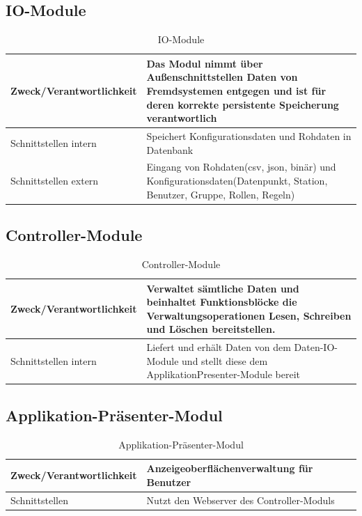 \subsection{IO-Module}
\begin{table}[th]
	\begin{tabularx}{\textwidth}{p{5cm} X}
		\hline
		 Zweck/Verantwortlichkeit & Das Modul nimmt über Außenschnittstellen Daten von Fremdsystemen entgegen und ist für deren korrekte persistente Speicherung verantwortlich  \\
		 \hline
		 Schnittstellen intern & Speichert Konfigurationsdaten und Rohdaten in Datenbank \\
		 \hline
		 Schnittstellen extern & Eingang von Rohdaten(csv, json, binär) und Konfigurationsdaten(Datenpunkt, Station, Benutzer, Gruppe, Rollen, Regeln) \\
		 \hline
	\end{tabularx} 
	\caption{IO-Module}
	\label{tab:IO-Module}
\end{table}

\subsection{Controller-Module}
\begin{table}[th]
	\begin{tabularx}{\textwidth}{p{5cm} X}
		\hline
		Zweck/Verantwortlichkeit & Verwaltet sämtliche Daten und beinhaltet Funktionsblöcke die Verwaltungsoperationen Lesen, Schreiben und Löschen bereitstellen. \\
		\hline
		Schnittstellen intern & Liefert und erhält Daten von dem Daten-IO-Module und stellt diese dem ApplikationPresenter-Module bereit\\
		\hline
	\end{tabularx} 
	\caption{Controller-Module}
	\label{Controller-Module}
\end{table}

\subsection{Applikation-Präsenter-Modul}
\begin{table}[th]
	\begin{tabularx}{\textwidth}{p{5cm} X}
		\hline
		Zweck/Verantwortlichkeit & Anzeigeoberflächenverwaltung für Benutzer \\
		\hline
		Schnittstellen & Nutzt den Webserver des Controller-Moduls\\
		\hline
	\end{tabularx} 
	\caption{Applikation-Präsenter-Modul}
	\label{tab:Applikation-Präsenter-Modul}
\end{table}
\clearpage
